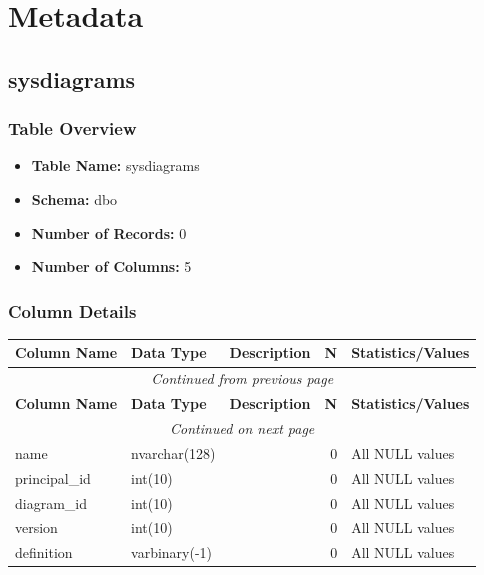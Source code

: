 \section{Metadata}

\begin{landscape}

\subsection{sysdiagrams}

\subsubsection{Table Overview}
\begin{itemize}
\item \textbf{Table Name:} sysdiagrams
\item \textbf{Schema:} dbo
\item \textbf{Number of Records:} 0
\item \textbf{Number of Columns:} 5
\end{itemize}

\subsubsection{Column Details}
\begin{longtable}{|l|l|l|r|p{6cm}|}
\hline
\textbf{Column Name} & \textbf{Data Type} & \textbf{Description} & \textbf{N} & \textbf{Statistics/Values} \\
\hline
\endfirsthead
\multicolumn{5}{c}{\textit{Continued from previous page}} \\
\hline
\textbf{Column Name} & \textbf{Data Type} & \textbf{Description} & \textbf{N} & \textbf{Statistics/Values} \\
\hline
\endhead
\hline
\multicolumn{5}{c}{\textit{Continued on next page}} \\
\endfoot
\hline
\endlastfoot
name & nvarchar(128) &  & 0 & All NULL values \\
\hline
principal\_id & int(10) &  & 0 & All NULL values \\
\hline
diagram\_id & int(10) &  & 0 & All NULL values \\
\hline
version & int(10) &  & 0 & All NULL values \\
\hline
definition & varbinary(-1) &  & 0 & All NULL values \\
\hline
\end{longtable}


\end{landscape}
